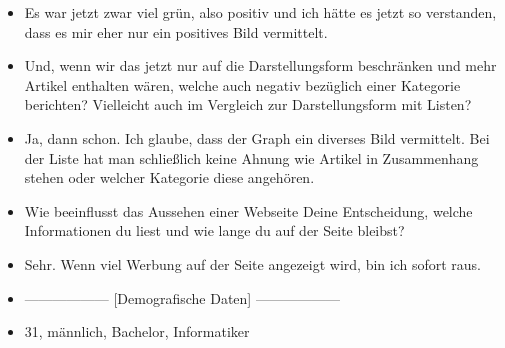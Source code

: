 {\begin{itemize}[]
            \item {} Es war jetzt zwar viel grün, also positiv und ich hätte es jetzt so verstanden, dass es mir eher nur ein positives Bild vermittelt.
            \item {} Und, wenn wir das jetzt nur auf die Darstellungsform beschränken und mehr Artikel enthalten wären, welche auch negativ bezüglich einer Kategorie berichten?
                  Vielleicht auch im Vergleich zur Darstellungsform mit Listen?
            \item {} Ja, dann schon. Ich glaube, dass der Graph ein diverses Bild vermittelt.
                  Bei der Liste hat man schließlich keine Ahnung wie Artikel in Zusammenhang stehen oder welcher Kategorie diese angehören.
            \item {} Wie beeinflusst das Aussehen einer Webseite Deine Entscheidung, welche Informationen du liest und wie lange du auf der Seite bleibst?
            \item {} Sehr. Wenn viel Werbung auf der Seite angezeigt wird, bin ich sofort raus.
            \item {------------------} [Demografische Daten] {------------------}
            \item {} 31, männlich, Bachelor, Informatiker
      \end{itemize}}
\nolinenumbers

